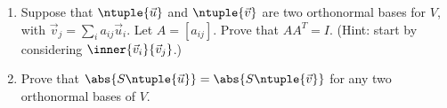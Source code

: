 \documentclass[letterpaper]{article}
\begin{document}
\begin{enumerate}
\begin{enumerate}
	\begin{proof}
	\[\def\arraystretch{1.5}
	\begin{array}{rcl}
	S\ntuple{\vec{v}}&=&S\left(\sum\limits_{i_1}a_{i_11}u_{i_1}, \, \, \sum\limits_{i_2}a_{i_22}u_{i_2}, \, \, \dots , \, \, \sum\limits_{i_n}a_{i_nn}u_{i_n}\right)\\
	&=&\sum\limits_{i_n} \dots \sum\limits_{i_1} (a_{{i_1}1})(\cdots)(a_{{i_n}n}) S(u_{{i_1}}, \ldots, u_{{i_n}})  \\
	&=& \sum\limits_\sigma (a_{{\sigma(1)}1})(\cdots)(a_{{\sigma(n)}n}) S(u_{\sigma(1)}, \dots, u_{\sigma(n)}) \\
	&=& \sum\limits_\sigma (\text{sign}\,\sigma)(a_{{\sigma(1)}1})(\cdots)(a_{{\sigma(n)}n}) S\ntuple{u}\\
	&=& \left(\sum\limits_\sigma (\text{sign}\,\sigma)(a_{{\sigma(1)}1})(\cdots)(a_{{\sigma(n)}n})\right) S\ntuple{u}\\
	&=& \det[a_{ij}] S\ntuple{\vec{u}}\\
	\end{array}\]
	\end{proof}		
	
	\item Suppose that $\ntuple{\vec{u}}$ and $\ntuple{\vec{v}}$ are two orthonormal bases for $V$, with  $\vec{v}_j=\sum_i a_{ij}\vec{u}_i$. Let $A=[a_{ij}]$. Prove that $AA^T=I$. (Hint: start by considering $\inner{\vec{v}_i}{\vec{v}_j}$.)
	\item Prove that $\abs{S\ntuple{\vec{u}}}=\abs{S\ntuple{\vec{v}}}$ for any two orthonormal bases of $V$. 
	\end{enumerate}

\end{enumerate}
\end{document}
